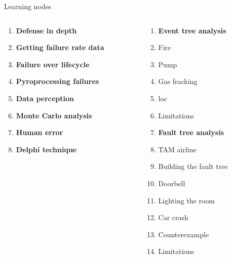 \documentclass[aspectratio=1610,pdftex,dvipsnames,compress,xcolor={dvipsnames}]{beamer}
\newcommand{\acs}{\acrshort} %
\begin{document}
\begin{frame}{Learning nodes}
    \begin{columns}[t]

        \begin{column}{0.50\textwidth}
            \begin{enumerate}[series=outerlist,topsep=0pt,itemsep=11pt,leftmargin=*,label=(\arabic*)]
                \item[]\textbf{Defense in depth}
                \item[]\textbf{Getting failure rate data}
                \item[]\textbf{Failure over lifecycle}
                \item[]\textbf{Pyroprocessing failures}
                \item[]\textbf{Data perception}
                \item[]\textbf{Monte Carlo analysis}
                \item[]\textbf{Human error}
                \item[]\textbf{Delphi technique}
            \end{enumerate}
        \end{column}

        \begin{column}{0.50\textwidth}
            \begin{enumerate}[series=outerlist,topsep=0pt,itemsep=1pt,leftmargin=*,label=(\arabic*)]
                \item[]\hfill\textbf{Event tree analysis}
                \item[]\hfill Fire 
                \item[]\hfill Pump
                \item[]\hfill Gas fracking  
                \item[]\hfill \acs{loc}
                \item[]\hfill Limitations
                    \vspace{0.15in}
                \item[]\hfill\textbf{Fault tree analysis}
                \item[]\hfill TAM airline
                \item[]\hfill Building the fault tree  
                \item[]\hfill Doorbell
                \item[]\hfill Lighting the room  
                \item[]\hfill Car crash  
                \item[]\hfill Counterexample
                \item[]\hfill Limitations
            \end{enumerate}
        \end{column}

    \end{columns}
\end{frame}
\end{document}
